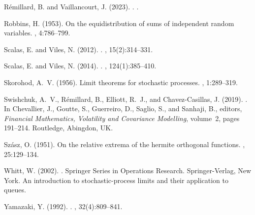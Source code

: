 \documentclass[final]{amsart}
\theoremstyle{definition}
\numberwithin{equation}{section}
\begin{document}
\begin{thebibliography}{}
Rémillard, B. and Vaillancourt, J. (2023).
.
.

Robbins, H. (1953).
\newblock On the equidistribution of sums of independent random variables.
, 4:786--799.

Scalas, E. and Viles, N. (2012).
.
, 15(2):314--331.

Scalas, E. and Viles, N. (2014).
.
, 124(1):385--410.

Skorohod, A.~V. (1956).
\newblock Limit theorems for stochastic processes.
, 1:289--319.

Swishchuk, A.~V., Rémillard, B., Elliott, R.~J., and Chavez-Casillas, J.
  (2019).
.
\newblock In Chevallier, J., Goutte, S., Guerreiro, D., Saglio, S., and
  Sanhaji, B., editors, {\em Financial Mathematics, Volatility and Covariance
  Modelling}, volume~2, pages 191--214. Routledge, Abingdon, UK.

Sz\'asz, O. (1951).
\newblock On the relative extrema of the hermite orthogonal functions.
, 25:129--134.

Whitt, W. (2002).
.
\newblock Springer Series in Operations Research. Springer-Verlag, New York.
\newblock An introduction to stochastic-process limits and their application to
  queues.

Yamazaki, Y. (1992).
.
, 32(4):809--841.

\end{thebibliography}
\end{document}
